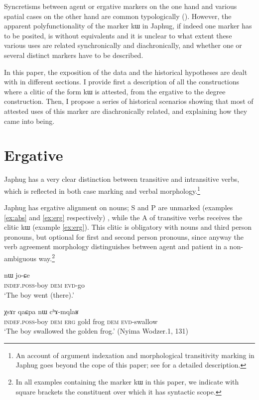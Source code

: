 \documentclass[oldfontcommands,oneside,a4paper,11pt]{article}
\newcommand{\ipa}[1]{{\phon #1}} %
\begin{document}
Syncretisms between agent or ergative markers  on the one hand and various spatial cases on the other hand are common typologically (\citealt{agent02palancar}). However, the apparent polyfunctionality of the marker \ipa{kɯ} in Japhug, if indeed one marker has to be posited, is without equivalents and it is unclear to what extent these various uses are related synchronically and diachronically, and whether one or several distinct markers have to be described.
 
In this paper, the exposition of the data and the historical hypotheses are dealt with in different sections.  
 I provide first a description of all the constructions where a clitic of the form \ipa{kɯ} is attested, from the ergative to the degree construction. Then, I propose a series of historical scenarios showing that most of  attested uses of this marker are diachronically related, and explaining how they  came into being.


\section{Ergative} \label{sec:erg}
Japhug has a very clear   distinction between transitive and intransitive verbs, which is reflected in both case marking and verbal morphology.\footnote{An account of argument indexation and morphological transitivity marking in Japhug goes beyond the cope of this paper; see \citet{jacques10inverse} for a detailed description.}

Japhug has ergative alignment on nouns; S and P are unmarked (examples \ref{ex:abs} and \ref{ex:erg} respectively) , while the A of transitive verbs receives the clitic \ipa{kɯ} (example \ref{ex:erg}). This clitic is obligatory with nouns and third person pronouns, but optional for first and second person pronouns, since anyway the verb agreement morphology distinguishes between agent and patient in a non-ambiguous way.\footnote{In all examples containing the marker \ipa{kɯ} in this paper, we indicate with square brackets the constituent over which it has syntactic scope.}

\begin{exe}
\ex \label{ex:abs}
\gll \ipa{tɤ-tɕɯ}  	\ipa{nɯ}  	 	\ipa{jo-ɕe}   \\
\textsc{indef.poss}-boy \textsc{dem}   \textsc{evd}-go \\
\glt `The boy went (there).'
\end{exe}

\begin{exe}
\ex \label{ex:erg}
\gll [\ipa{tɤ-tɕɯ}  	\ipa{nɯ}]  	\ipa{\textbf{kɯ}} 	\ipa{χsɤr}  	\ipa{qaɕpa}  	\ipa{nɯ}  	\ipa{cʰɤ-mqlaʁ}   \\
\textsc{indef.poss}-boy \textsc{dem} \textsc{erg} gold frog \textsc{dem} \textsc{evd}-swallow \\
\glt `The boy swallowed the golden frog.' (Nyima Wodzer.1, 131)
\end{exe}
\end{document}
